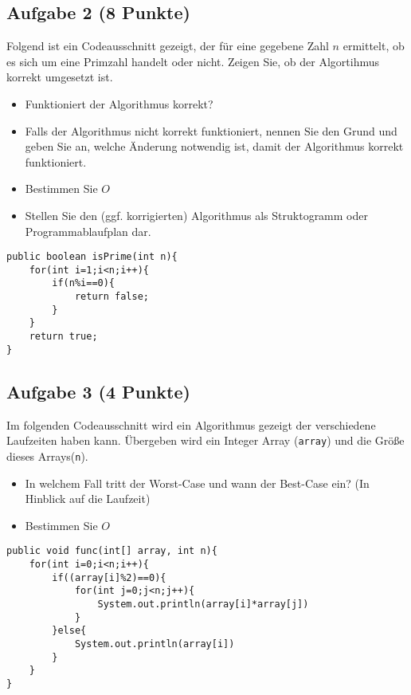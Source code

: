 \documentclass[a4paper,
			   fontsize=12pt]{article}
\begin{document}
\vspace{6cm}

\subsection*{Aufgabe 2 (8 Punkte)}
Folgend ist ein Codeausschnitt gezeigt, der für eine gegebene Zahl $n$ ermittelt, ob es sich um eine Primzahl handelt oder nicht. Zeigen Sie, ob der Algortihmus korrekt umgesetzt ist.
\begin{itemize}
	\item Funktioniert der Algorithmus korrekt?
	\item Falls der Algorithmus nicht korrekt funktioniert, nennen Sie den Grund und geben Sie an, welche Änderung notwendig ist, damit der Algorithmus korrekt funktioniert.
	\item Bestimmen Sie $O$
	\item Stellen Sie den (ggf. korrigierten) Algorithmus als Struktogramm oder Programmablaufplan dar.
\end{itemize}

\lstset{style=java}
\begin{lstlisting}
public boolean isPrime(int n){
	for(int i=1;i<n;i++){
		if(n%i==0){
			return false;
		}
	}
	return true;
}
\end{lstlisting}

\vspace{7,5cm}

\subsection*{Aufgabe 3 (4 Punkte)}
Im folgenden Codeausschnitt wird ein Algorithmus gezeigt der verschiedene Laufzeiten haben kann. Übergeben wird ein Integer Array (\texttt{array}) und die Größe dieses
Arrays(\texttt{n}).
\begin{itemize}
	\item In welchem Fall tritt der Worst-Case und wann der Best-Case ein? (In Hinblick auf die Laufzeit)
	\item Bestimmen Sie $O$
\end{itemize}  

\begin{lstlisting}
public void func(int[] array, int n){
    for(int i=0;i<n;i++){
		if((array[i]%2)==0){
			for(int j=0;j<n;j++){
				System.out.println(array[i]*array[j])
			}
        }else{
			System.out.println(array[i])
        }
    }
}
\end{lstlisting}
\end{document}
